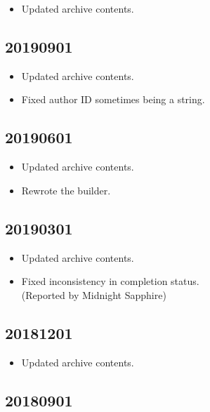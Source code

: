 \documentclass[hidelinks,a4paper,12pt]{article}
\begin{document}
\begin{itemize}
\item Updated archive contents.
\end{itemize}

\subsection{20190901}  \label{sec:changelog_20190901}

\begin{itemize}
\item Updated archive contents.
\item Fixed author ID sometimes being a string.
\end{itemize}

\subsection{20190601}  \label{sec:changelog_20190601}

\begin{itemize}
\item Updated archive contents.
\item Rewrote the builder.
\end{itemize}

\subsection{20190301}  \label{sec:changelog_20190301}

\begin{itemize}
\item Updated archive contents.
\item Fixed inconsistency in completion status.
  \\ (Reported by Midnight Sapphire)
\end{itemize}

\subsection{20181201}  \label{sec:changelog_20181201}

\begin{itemize}
\item Updated archive contents.
\end{itemize}

\subsection{20180901}  \label{sec:changelog_20180901}
\end{document}
